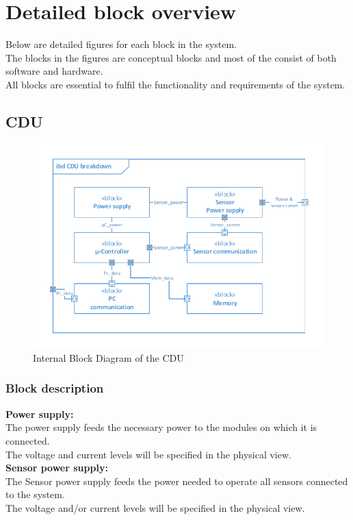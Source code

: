 \section{Detailed block overview}
Below are detailed figures for each block in the system.\\
The blocks in the figures are conceptual blocks and most of the consist of both software and hardware.\\
All blocks are essential to fulfil the functionality and requirements of the system.

\subsection{CDU}

\begin{figure}[hbpt]
\centering
\includegraphics[width=.8\textwidth]{billeder/CDU_IBD}
\caption{Internal Block Diagram of the CDU}
\label{CDU_IBD}
\end{figure}

\subsubsection{Block description}

\textbf{Power supply:}\\
The power supply feeds the necessary power to the modules on which it is connected.\\
The voltage and current levels will be specified in the physical view.\\

\textbf{Sensor power supply:}\\
The Sensor power supply feeds the power needed to operate all sensors connected to the system.\\
The voltage and/or current levels will be specified in the physical view.\\

